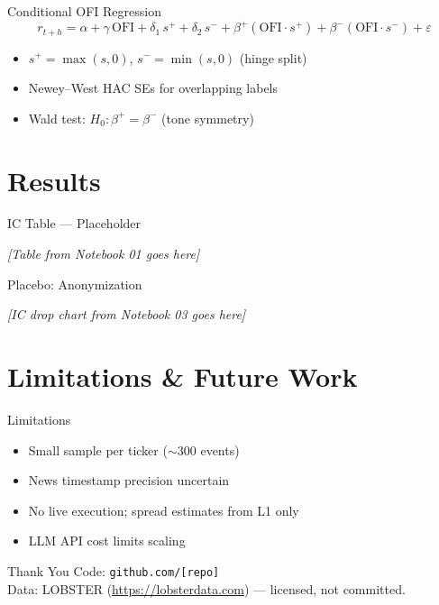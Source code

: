 \documentclass[aspectratio=169, 10pt]{beamer}
\begin{document}
\begin{frame}{Conditional OFI Regression}
\[
r_{t+h} = \alpha + \gamma\,\text{OFI} + \delta_1\,s^+ + \delta_2\,s^-
+ \beta^+(\text{OFI}\cdot s^+) + \beta^-(\text{OFI}\cdot s^-)
+ \varepsilon
\]
\begin{itemize}
  \item $s^+ = \max(s,0)$, $s^- = \min(s,0)$ (hinge split)
  \item Newey--West HAC SEs for overlapping labels
  \item Wald test: $H_0\colon\beta^+=\beta^-$ (tone symmetry)
\end{itemize}
\end{frame}

\section{Results}
\begin{frame}{IC Table — Placeholder}
\begin{center}
\textit{[Table from Notebook 01 goes here]}
\end{center}
\end{frame}

\begin{frame}{Placebo: Anonymization}
\begin{center}
\textit{[IC drop chart from Notebook 03 goes here]}
\end{center}
\end{frame}

\section{Limitations \& Future Work}
\begin{frame}{Limitations}
\begin{itemize}
  \item Small sample per ticker ($\sim$300 events)
  \item News timestamp precision uncertain
  \item No live execution; spread estimates from L1 only
  \item LLM API cost limits scaling
\end{itemize}
\end{frame}

\begin{frame}{Thank You}
\centering
Code: \texttt{github.com/[repo]}\\[1em]
Data: LOBSTER (\url{https://lobsterdata.com}) — licensed, not committed.
\end{frame}
\end{document}
